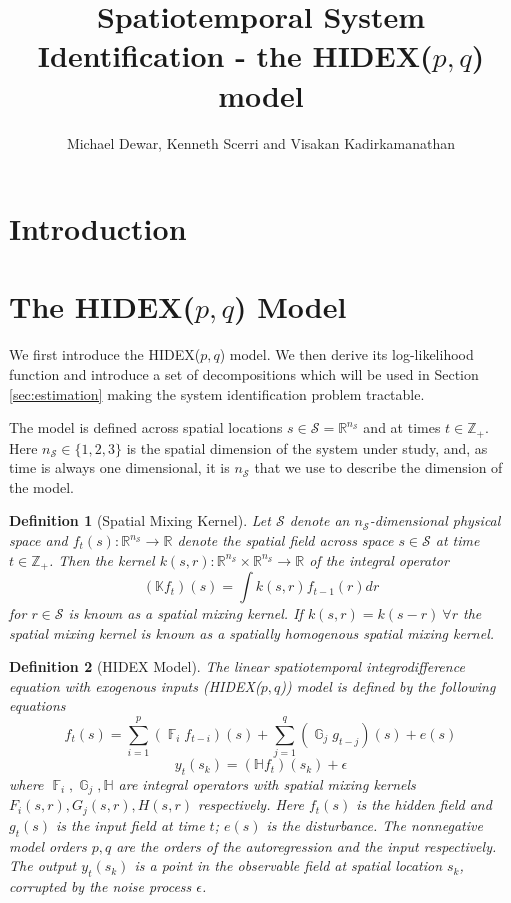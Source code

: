 \documentclass{IEEEtran}
\title{Spatiotemporal System Identification - the HIDEX($p,q$) model}
\author{Michael Dewar, Kenneth Scerri and Visakan Kadirkamanathan}
\DeclareMathOperator{\F}{\mathbb{F}}
\DeclareMathOperator{\G}{\mathbb{G}}
\DeclareMathOperator{\onto}{\rightarrow}
\newtheorem{definition}{Definition}
\begin{document}
\maketitle

\section{Introduction}

\section{The HIDEX($p,q$) Model}
\label{sec:model}

We first introduce the HIDEX($p,q$) model. We then derive its log-likelihood function and introduce a set of decompositions which will be used in Section \ref{sec:estimation} making the system identification problem tractable. 

The model is defined across spatial locations $s \in \mathcal{S} = \mathbb{R}^{n_\mathcal{S}}$ and at times $t \in \mathbb{Z}_+$. Here $n_\mathcal{S} \in \{1,2,3\}$ is the spatial dimension of the system under study, and, as time is always one dimensional, it is $n_\mathcal{S}$ that we use to describe the dimension of the model. 

\begin{definition}[Spatial Mixing Kernel]
	Let $\mathcal{S}$ denote an $n_\mathcal{S}$-dimensional physical space and $f_t(s): \mathbb{R}^{n_\mathcal{S}} \onto \mathbb{R}$ denote the spatial field across space $s \in \mathcal{S}$ at time $t \in \mathbb{Z}_+$. Then the kernel $k(s,r): \mathbb{R}^{n_\mathcal{S}} \times \mathbb{R}^{n_\mathcal{S}} \onto \mathbb{R}$ of the integral operator
	\begin{equation}
		(\mathbb{K}f_t)(s) = \int k(s,r) f_{t-1}(r) dr
	\end{equation}
	for $r \in \mathcal{S}$ is known as a \emph{spatial mixing kernel}. If $k(s,r) = k(s-r) ~ \forall r$ the spatial mixing kernel is known as a \emph{spatially homogenous spatial mixing kernel}.
\end{definition}

\begin{definition}[HIDEX Model]
	\label{def:hidex}
	The linear spatiotemporal integrodifference equation with exogenous inputs (HIDEX($p,q$)) model is defined by the following equations
	\begin{equation}
		\label{eqn:hidex-hidden}
	f_t(s)= \sum_{i=1}^{p} (\F_i f_{t-i})(s) + \sum_{j=1}^{q}(\G_j g_{t-j})(s)+e(s)
	\end{equation}
	\begin{equation}
	\label{eqn:hidex-obs}
	y_t(s_k) = (\mathbb{H}f_t)(s_k) + \epsilon
	\end{equation}
	where $\F_i,\G_j,\mathbb{H}$ are integral operators with spatial mixing kernels $F_i(s,r), G_j(s,r), H(s,r)$ respectively. Here $f_t(s)$ is the hidden field and $g_{t}(s)$ is the input field at time $t$; $e(s)$ is the disturbance. The nonnegative model orders $p,q$ are the orders of the autoregression and the input respectively. The output $y_t(s_k)$ is a point in the observable field at spatial location $s_k$, corrupted by the noise process $\epsilon$.
\end{definition}
\end{document}

